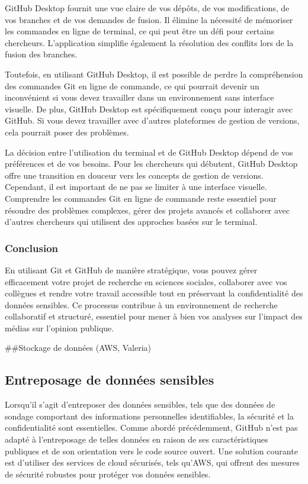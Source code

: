 \documentclass[
  letterpaper,
  DIV=11,
  numbers=noendperiod]{scrreprt}
\begin{document}
GitHub Desktop fournit une vue claire de vos dépôts, de vos
modifications, de vos branches et de vos demandes de fusion. Il élimine
la nécessité de mémoriser les commandes en ligne de terminal, ce qui
peut être un défi pour certains chercheurs. L'application simplifie
également la résolution des conflits lors de la fusion des branches.

Toutefois, en utilisant GitHub Desktop, il est possible de perdre la
compréhension des commandes Git en ligne de commande, ce qui pourrait
devenir un inconvénient si vous devez travailler dans un environnement
sans interface visuelle. De plus, GitHub Desktop est spécifiquement
conçu pour interagir avec GitHub. Si vous devez travailler avec d'autres
plateformes de gestion de versions, cela pourrait poser des problèmes.

La décision entre l'utilisation du terminal et de GitHub Desktop dépend
de vos préférences et de vos besoins. Pour les chercheurs qui débutent,
GitHub Desktop offre une transition en douceur vers les concepts de
gestion de versions. Cependant, il est important de ne pas se limiter à
une interface visuelle. Comprendre les commandes Git en ligne de
commande reste essentiel pour résoudre des problèmes complexes, gérer
des projets avancés et collaborer avec d'autres chercheurs qui utilisent
des approches basées sur le terminal.

\subsubsection{Conclusion}\label{conclusion-2}

En utilisant Git et GitHub de manière stratégique, vous pouvez gérer
efficacement votre projet de recherche en sciences sociales, collaborer
avec vos collègues et rendre votre travail accessible tout en préservant
la confidentialité des données sensibles. Ce processus contribue à un
environnement de recherche collaboratif et structuré, essentiel pour
mener à bien vos analyses sur l'impact des médias sur l'opinion
publique.

\#\#Stockage de données (AWS, Valeria)

\subsection{Entreposage de données
sensibles}\label{entreposage-de-donnuxe9es-sensibles}

Lorsqu'il s'agit d'entreposer des données sensibles, tels que des
données de sondage comportant des informations personnelles
identifiables, la sécurité et la confidentialité sont essentielles.
Comme abordé précédemment, GitHub n'est pas adapté à l'entreposage de
telles données en raison de ses caractéristiques publiques et de son
orientation vers le code source ouvert. Une solution courante est
d'utiliser des services de cloud sécurisés, tels qu'AWS, qui offrent des
mesures de sécurité robustes pour protéger vos données sensibles.
\end{document}
